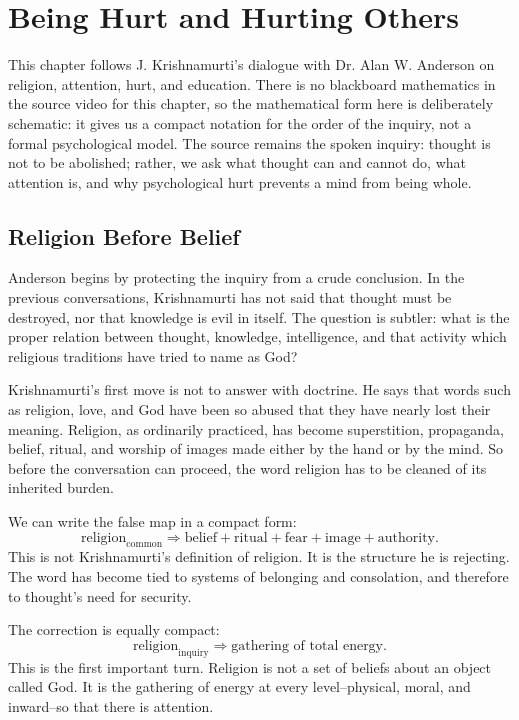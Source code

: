 \chapter{Being Hurt and Hurting Others}

This chapter follows J. Krishnamurti's dialogue with Dr. Alan W. Anderson on religion, attention, hurt, and education. There is no blackboard mathematics in the source video for this chapter, so the mathematical form here is deliberately schematic: it gives us a compact notation for the order of the inquiry, not a formal psychological model. The source remains the spoken inquiry: thought is not to be abolished; rather, we ask what thought can and cannot do, what attention is, and why psychological hurt prevents a mind from being whole.

\section{Religion Before Belief}

Anderson begins by protecting the inquiry from a crude conclusion. In the previous conversations, Krishnamurti has not said that thought must be destroyed, nor that knowledge is evil in itself. The question is subtler: what is the proper relation between thought, knowledge, intelligence, and that activity which religious traditions have tried to name as God?

Krishnamurti's first move is not to answer with doctrine. He says that words such as religion, love, and God have been so abused that they have nearly lost their meaning. Religion, as ordinarily practiced, has become superstition, propaganda, belief, ritual, and worship of images made either by the hand or by the mind. So before the conversation can proceed, the word religion has to be cleaned of its inherited burden.

We can write the false map in a compact form:
\begin{equation}
\text{religion}_{\text{common}}
\Rightarrow
\text{belief}+\text{ritual}+\text{fear}+\text{image}+\text{authority}.
\end{equation}
This is not Krishnamurti's definition of religion. It is the structure he is rejecting. The word has become tied to systems of belonging and consolation, and therefore to thought's need for security.

The correction is equally compact:
\begin{equation}
\text{religion}_{\text{inquiry}}
\Rightarrow
\text{gathering of total energy}.
\end{equation}
This is the first important turn. Religion is not a set of beliefs about an object called God. It is the gathering of energy at every level--physical, moral, and inward--so that there is attention.

